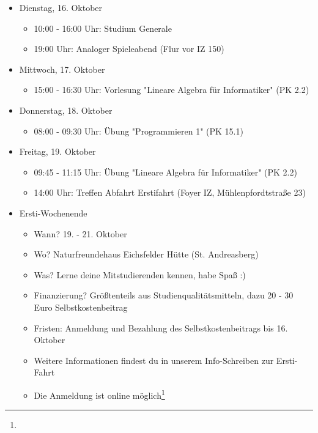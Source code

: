 \begin{itemize}
\begin{itemize}
            \item 10:30 - 12:00 Uhr: Infobörse "Studium ist mehr" (Foyer Altebäude/Audimax)
            \item 11:30 - 13:00 Uhr: Vorlesung "Lineare Algebra für Informatiker" (PK 2.2)
            \item 13:15 - 14:15 Uhr: Begrüßung durch das Department Informatik (PK 2.2)
            \item 15:00 - 16:30 Uhr: Vorlesung "Programmieren 1"
            \item Abends: Uniweiter Erstsemesterparty (Diskothek Jolly Time)
        \end{itemize}
    \item Dienstag, 16. Oktober
        \begin{itemize}
            \item 10:00 - 16:00 Uhr: Studium Generale 
            \item 19:00 Uhr: Analoger Spieleabend (Flur vor IZ 150)
        \end{itemize}
    \item Mittwoch, 17. Oktober
        \begin{itemize}
            \item 15:00 - 16:30 Uhr: Vorlesung "Lineare Algebra für Informatiker" (PK 2.2)
        \end{itemize}
    \item Donnerstag, 18. Oktober
        \begin{itemize}
            \item 08:00 - 09:30 Uhr: Übung "Programmieren 1" (PK 15.1)
        \end{itemize}
    \item Freitag, 19. Oktober
        \begin{itemize}
            \item 09:45 - 11:15 Uhr: Übung "Lineare Algebra für Informatiker" (PK 2.2)
            \item 14:00 Uhr: Treffen Abfahrt Erstifahrt (Foyer IZ, Mühlenpfordtstraße 23)
        \end{itemize}
    \item Ersti-Wochenende
        \begin{itemize}
            \item Wann? 19. - 21. Oktober
            \item Wo? Naturfreundehaus Eichsfelder Hütte (St. Andreasberg)
            \item Was? Lerne deine Mitstudierenden kennen, habe Spaß :)
            \item Finanzierung? Größtenteils aus Studienqualitätsmitteln, dazu 20 - 30 Euro Selbstkostenbeitrag
            \item Fristen: Anmeldung und Bezahlung des Selbstkostenbeitrags bis 16. Oktober
            \item Weitere Informationen findest du in unserem Info-Schreiben zur Ersti-Fahrt
            \item Die Anmeldung ist online möglich\footnote{}
        \end{itemize}
\end{itemize}
